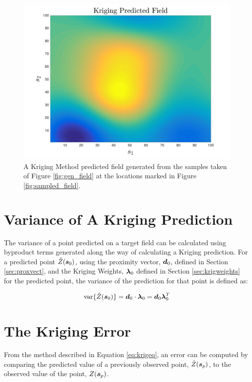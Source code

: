 \begin{figure}[!]
    \centering
    \includegraphics[width=0.8\linewidth]{figures/kriging_prediction.png}
    \ssp
    \caption{A Kriging Method predicted field generated from the samples taken of Figure \ref{fig:gen_field} at the locations marked in Figure \ref{fig:sampled_field}.}
    \label{fig:krig_field}
\end{figure}

\section{Variance of A Kriging Prediction} \label{sec:krigvar}
The variance of a point predicted on a target field can be calculated using byproduct terms generated along the way of calculating a Kriging prediction. For a predicted point $\hat{Z}({\it{\boldsymbol{s}}}_0)$, using the proximity vector, ${\it{\boldsymbol{d}}}_0$, defined in Section \ref{sec:proxvect}, and the Kriging Weights, ${\it{\boldsymbol{\lambda}}}_0$ defined in Section \ref{sec:krigweights} for the predicted point, the variance of the prediction for that point is defined as:

\begin{equation}
    \text{var}\{\hat{Z}({\it{\boldsymbol{s}}}_0)\} = {\it{\boldsymbol{d}}}_0 \cdot {\it{\boldsymbol{\lambda}}}_0 = {\it{\boldsymbol{d}}}_0 {\it{\boldsymbol{\lambda}}}_0^T
\end{equation}

\section{The Kriging Error}
From the method described in Equation \ref{eq:krigeq}, an error can be computed by comparing the predicted value of a previously observed point, $\hat{Z}({\it{\boldsymbol{s}}}_p)$, to the observed value of the point, $Z({\it{\boldsymbol{s}}}_p)$.

